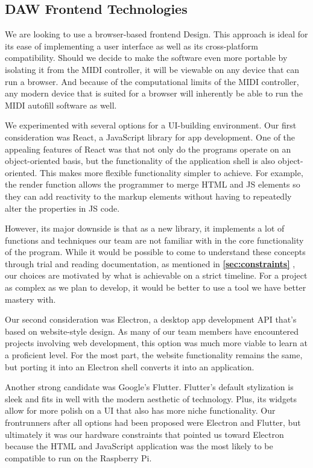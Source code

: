 \subsection{DAW Frontend Technologies}

We are looking to use a browser-based frontend Design. This approach is ideal for its ease
of implementing a user interface as well as its cross-platform compatibility. Should we
decide to make the software even more portable by isolating it from the MIDI controller,
it will be viewable on any device that can run a browser. And because of the computational
limits of the MIDI controller, any modern device that is suited for a browser will
inherently be able to run the MIDI autofill software as well.

We experimented with several options for a UI-building environment. Our first consideration was
React, a JavaScript library for app development. One of the appealing features of React was that
not only do the programs operate on an object-oriented basis, but the functionality of the
application shell is also object-oriented. This makes more flexible functionality simpler to
achieve. For example, the render function allows the programmer to merge HTML and JS elements so
they can add reactivity to the markup elements without having to repeatedly alter the properties
in JS code.

However, its major downside is that as a new library, it implements a lot of functions and
techniques our team are not familiar with in the core functionality of the program. While it would
be possible to come to understand these concepts through trial and reading documentation, as
mentioned in \textbf{\ref{sec:constraints} }, our choices are motivated by
what is achievable on a strict timeline. For a project as complex as we plan to develop, it would
be better to use a tool we have better mastery with.

Our second consideration was Electron, a desktop app development API that’s based on website-style
design. As many of our team members have encountered projects involving web development, this
option was much more viable to learn at a proficient level. For the most part, the website
functionality remains the same, but porting it into an Electron shell converts it into an
application.

Another strong candidate was Google’s Flutter. Flutter’s default stylization is sleek and fits in
well with the modern aesthetic of technology. Plus, its widgets allow for more polish on a UI that
also has more niche functionality. Our frontrunners after all options had been proposed were
Electron and Flutter, but ultimately it was our hardware constraints that pointed us toward
Electron because the HTML and JavaScript application was the most likely to be compatible to run on
the Raspberry Pi.

